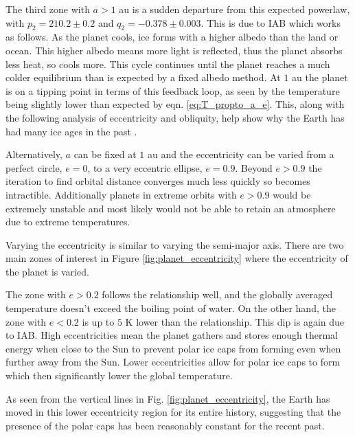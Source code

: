\documentclass[12pt, onecolumn]{revtex4-2}    %
\begin{document}
The third zone with $a > 1$ au is a sudden departure from this expected powerlaw, with $p_2 = 210.2 \pm 0.2$ and $q_2 = -0.378 \pm 0.003$.
This is due to IAB which works as follows.
As the planet cools, ice forms with a higher albedo than the land or ocean.
This higher albedo means more light is reflected, thus the planet absorbs less heat, so cools more.
This cycle continues until the planet reaches a much colder equilibrium than is expected by a fixed albedo method.
At $1$ au the planet is on a tipping point in terms of this feedback loop, as seen by the temperature being slightly lower than expected by eqn. \eqref{eq:T_propto_a_e}.
This, along with the following analysis of eccentricity and obliquity, help show why the Earth has had many ice ages in the past \cite{Emiliani78}.

Alternatively, $a$ can be fixed at $1$ au and the eccentricity can be varied from a perfect circle, $e = 0$, to a very eccentric ellipse, $e = 0.9$.
Beyond $e > 0.9$ the iteration to find orbital distance converges much less quickly so becomes intractible.
Additionally planets in extreme orbits with $e > 0.9$ would be extremely unstable and most likely would not be able to retain an atmosphere due to extreme temperatures.

Varying the eccentricity is similar to varying the semi-major axis.
There are two main zones of interest in Figure \ref{fig:planet_eccentricity} where the eccentricity of the planet is varied.

The zone with $e > 0.2$ follows the relationship well, and the globally averaged temperature doesn't exceed the boiling point of water.
On the other hand, the zone with $e < 0.2$ is up to $5$ K lower than the relationship.
This dip is again due to IAB.
High eccentricities mean the planet gathers and stores enough thermal energy when close to the Sun to prevent polar ice caps from forming even when further away from the Sun.
Lower eccentricities allow for polar ice caps to form which then significantly lower the global temperature.

As seen from the vertical lines in Fig. \ref{fig:planet_eccentricity}, the Earth has moved in this lower eccentricity region for its entire history, suggesting that the presence of the polar caps has been reasonably constant for the recent past.
\end{document}
